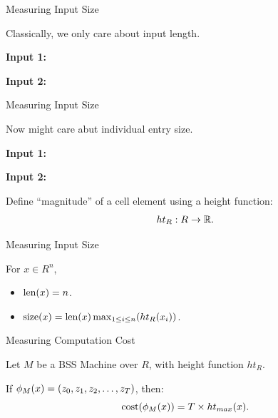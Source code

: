 \documentclass[c]{beamer}
\begin{document}
\begin{frame}{Measuring Input Size}

  Classically, we only care about input length.

  \begin{center}
    \textbf{Input 1:}
  \end{center}

  \begin{center}
    \textbf{Input 2:}
  \end{center}

\end{frame}

\begin{frame}{Measuring Input Size}

  Now might care abut individual entry size.

  \begin{center}
    \textbf{Input 1:}
  \end{center}

  \begin{center}
    \textbf{Input 2:}
  \end{center}\pause

  Define ``magnitude'' of a cell element using a height function:
  $$ht_R:R \rightarrow \mathbb{R}.$$
\end{frame}

\begin{frame}{Measuring Input Size}
  
  For $x \in R^n$,
  \begin{itemize}
  \item[] $\text{len}(x) = n$.
  \item[] $\text{size}(x) = \text{len}(x)\max_{1 \leq i \leq n}(ht_R(x_i))$.
  \end{itemize}
  
\end{frame}

\begin{frame}{Measuring Computation Cost}
  
  Let $M$ be a BSS Machine over $R$, with height function $ht_R$.
  
  \vspace{\baselineskip}

  If $\phi_M(x) = (z_0, z_1, z_2, \ldots, z_T)$, then:
  $$\text{cost}(\phi_M(x)) = T\times ht_{max}(x).$$
  
\end{frame}
\end{document}
